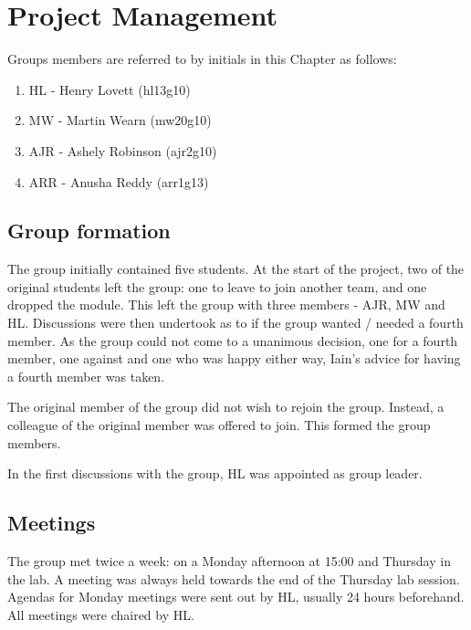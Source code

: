 
\chapter{Project Management}

Groups members are referred to by initials in this Chapter as follows:
\begin{enumerate}
\item HL - Henry Lovett (hl13g10)
\item MW - Martin Wearn (mw20g10)
\item AJR - Ashely Robinson (ajr2g10)
\item ARR - Anusha Reddy (arr1g13)
\end{enumerate}

\section{Group formation}

The group initially contained five students. 
At the start of the project, two of the original students left the group: one to leave to join another team, and one dropped the module.
This left the group with three members - AJR, MW and HL. 
Discussions were then undertook as to if the group wanted / needed a fourth member. 
As the group could not come to a unanimous decision, one for a fourth member, one against and one who was happy either way, Iain's advice for having a fourth member was taken. 

The original member of the group did not wish to rejoin the group.
Instead, a colleague of the original member was offered to join.
This formed the group members. 

In the first discussions with the group, HL was appointed as group leader. 

\section{Meetings}

The group met twice a week: on a Monday afternoon at 15:00 and Thursday in the lab.
A meeting was always held towards the end of the Thursday lab session.
Agendas for Monday meetings were sent out by HL, usually 24 hours beforehand. 
All meetings were chaired by HL.

